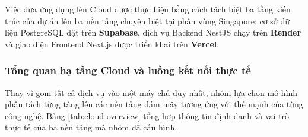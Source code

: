 Việc đưa ứng dụng lên Cloud được thực hiện bằng cách tách biệt ba tầng kiến trúc của dự án lên ba nền tảng chuyên biệt tại phân vùng Singapore: cơ sở dữ liệu PostgreSQL đặt trên \textbf{Supabase}, dịch vụ Backend NestJS chạy trên \textbf{Render} và giao diện Frontend Next.js được triển khai trên \textbf{Vercel}.

\subsubsection{Tổng quan hạ tầng Cloud và luồng kết nối thực tế}
Thay vì gom tất cả dịch vụ vào một máy chủ duy nhất, nhóm lựa chọn mô hình phân tách từng tầng lên các nền tảng đám mây tương ứng với thế mạnh của từng công nghệ. Bảng \ref{tab:cloud-overview} tổng hợp thông tin định danh và vai trò thực tế của ba nền tảng mà nhóm đã cấu hình.

